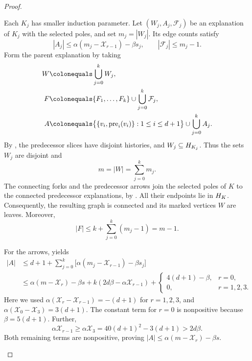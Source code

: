 \begin{proof}
\begin{enumerate}
    Each $K_j$ has smaller induction parameter. Let
    $(W_j,A_j,\mathcal{F}_j)$ be an explanation of $K_j$ with the
    selected poles, and set $m_j=|W_j|$. Its edge counts satisfy
    \[
      |A_j|\leq\alpha(m_j-\mathcal{X}_{r-1})-\beta s_j,
      \qquad |\mathcal{F}_j|\leq m_j-1.
    \]
    Form the parent explanation by taking
    \begin{align*}
      W&\colonequals\bigcup_{j=0}^k W_j,\\
      F&\colonequals\{F_1,\ldots,F_k\}
                         \cup\bigcup_{j=0}^k\mathcal{F}_j,\\
      A&\colonequals\bigl\{\{v_i,\prei{v_i}\}:1\leq i\leq d+1\bigr\}
                         \cup\bigcup_{j=0}^k A_j.
    \end{align*}
    By , the predecessor slices have disjoint
    histories, and $W_j\subseteq H_{K_j}$. Thus the sets $W_j$
    are disjoint and
    \[
      m=|W|=\sum_{j=0}^k m_j.
    \]
    The connecting forks and the predecessor arrows join the selected
    poles of $K$ to the connected predecessor explanations, by
    . All their endpoints lie in $H_{K}$.
    Consequently, the resulting graph is connected and its marked vertices
    $W$ are leaves. Moreover,
    \[
      |F|\leq k+\sum_{j=0}^k(m_j-1)=m-1.
    \]

    For the arrows,  yields
    \begin{align*}
      |A|
      &\leq d+1+\sum_{j=0}^k
             \bigl[\alpha(m_j-\mathcal{X}_{r-1})-\beta s_j\bigr]\\
      &\leq \alpha(m-\mathcal{X}_r)-\beta s
          +k(2d\beta-\alpha\mathcal{X}_{r-1})
          +\begin{cases}
              4(d+1)-\beta,&r=0,\\
              0,&r=1,2,3.
            \end{cases}
    \end{align*}
    Here we used
    $\alpha(\mathcal{X}_r-\mathcal{X}_{r-1})=-(d+1)$
    for $r=1,2,3$, and
    $\alpha(\mathcal{X}_0-\mathcal{X}_3)=3(d+1)$.
    The constant term for $r=0$ is nonpositive because
    $\beta=5(d+1)$. Further,
    \[
      \alpha\mathcal{X}_{r-1}
      \geq\alpha\mathcal{X}_3
      =40(d+1)^2-3(d+1)>2d\beta.
    \]
    Both remaining terms are nonpositive, proving
    $|A|\leq\alpha(m-\mathcal{X}_r)-\beta s$.
  \end{enumerate}


\end{proof}
